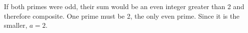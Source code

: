 If both primes were odd, their sum would be an even integer greater than 2 and therefore composite. One prime must be 2, the only even prime. Since it is the smaller, $\boxed{a=2}$.
